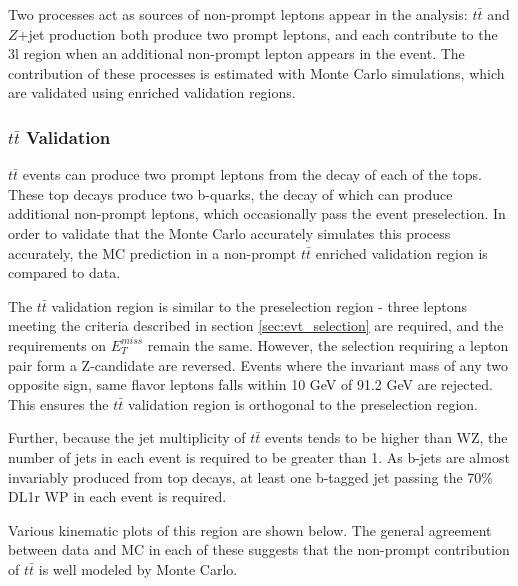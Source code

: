 Two processes act as sources of non-prompt leptons appear in the analysis: $t\bar{t}$ and $Z$+jet production both produce two prompt leptons, and each contribute to the 3l region when an additional non-prompt lepton appears in the event. The contribution of these processes is estimated with Monte Carlo simulations, which are validated using enriched validation regions.

\subsubsection{$t\bar{t}$ Validation}

$t\bar{t}$ events can produce two prompt leptons from the decay of each of the tops. These top decays produce two b-quarks, the decay of which can produce additional non-prompt leptons, which occasionally pass the event preselection. In order to validate that the Monte Carlo accurately simulates this process accurately, the MC prediction in a non-prompt $t\bar{t}$ enriched validation region is compared to data.

The $t\bar{t}$ validation region is similar to the preselection region - three leptons meeting the criteria described in section \ref{sec:evt_selection} are required, and the requirements on $E_T^{miss}$ remain the same. However, the selection requiring a lepton pair form a Z-candidate are reversed. Events where the invariant mass of any two opposite sign, same flavor leptons falls within 10 GeV of 91.2 GeV are rejected. This ensures the $t\bar{t}$ validation region is orthogonal to the preselection region. 

Further, because the jet multiplicity of $t\bar{t}$ events tends to be higher than WZ, the number of jets in each event is required to be greater than 1. As b-jets are almost invariably produced from top decays, at least one b-tagged jet passing the 70\% DL1r WP in each event is required. 



Various kinematic plots of this region are shown below. The general agreement between data and MC in each of these suggests that the non-prompt contribution of $t\bar{t}$ is well modeled by Monte Carlo.

